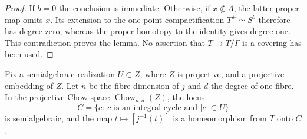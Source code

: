 \begin{proof}
If $b=0$ the conclusion is immediate.  Otherwise, if $x\notin A$, the latter proper map omits $x$.  Its extension to the one-point compactification $T^+\simeq S^b$ therefore has degree zero, whereas the proper homotopy to the identity gives degree one.  This contradiction proves the lemma.  No assertion that $T\to T/\Gamma$ is a covering has been used.
\end{proof}

\begin{lemma}
\label{lem:cmp-chow-base}
Fix a semialgebraic realization $U\subset Z$, where $Z$ is projective, and a projective embedding of $Z$.  Let $n$ be the fibre dimension of $j$ and $d$ the degree of one fibre.  In the projective Chow space $\operatorname{Chow}_{n,d}(Z)$, the locus
\[
 C=\{c:\ c\text{ is an integral cycle and }|c|\subset U\}
\]
is semialgebraic, and the map $t\mapsto[j^{-1}(t)]$ is a homeomorphism from $T$ onto $C$.
\end{lemma}

